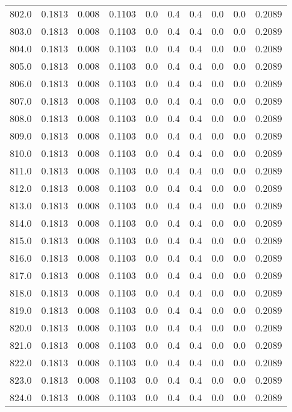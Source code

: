 \begin{longtable}{lrrrrrrrrr}
802.0 & 0.1813 & 0.008 & 0.1103 & 0.0 & 0.4 & 0.4 & 0.0 & 0.0 & 0.2089 \\
803.0 & 0.1813 & 0.008 & 0.1103 & 0.0 & 0.4 & 0.4 & 0.0 & 0.0 & 0.2089 \\
804.0 & 0.1813 & 0.008 & 0.1103 & 0.0 & 0.4 & 0.4 & 0.0 & 0.0 & 0.2089 \\
805.0 & 0.1813 & 0.008 & 0.1103 & 0.0 & 0.4 & 0.4 & 0.0 & 0.0 & 0.2089 \\
806.0 & 0.1813 & 0.008 & 0.1103 & 0.0 & 0.4 & 0.4 & 0.0 & 0.0 & 0.2089 \\
807.0 & 0.1813 & 0.008 & 0.1103 & 0.0 & 0.4 & 0.4 & 0.0 & 0.0 & 0.2089 \\
808.0 & 0.1813 & 0.008 & 0.1103 & 0.0 & 0.4 & 0.4 & 0.0 & 0.0 & 0.2089 \\
809.0 & 0.1813 & 0.008 & 0.1103 & 0.0 & 0.4 & 0.4 & 0.0 & 0.0 & 0.2089 \\
810.0 & 0.1813 & 0.008 & 0.1103 & 0.0 & 0.4 & 0.4 & 0.0 & 0.0 & 0.2089 \\
811.0 & 0.1813 & 0.008 & 0.1103 & 0.0 & 0.4 & 0.4 & 0.0 & 0.0 & 0.2089 \\
812.0 & 0.1813 & 0.008 & 0.1103 & 0.0 & 0.4 & 0.4 & 0.0 & 0.0 & 0.2089 \\
813.0 & 0.1813 & 0.008 & 0.1103 & 0.0 & 0.4 & 0.4 & 0.0 & 0.0 & 0.2089 \\
814.0 & 0.1813 & 0.008 & 0.1103 & 0.0 & 0.4 & 0.4 & 0.0 & 0.0 & 0.2089 \\
815.0 & 0.1813 & 0.008 & 0.1103 & 0.0 & 0.4 & 0.4 & 0.0 & 0.0 & 0.2089 \\
816.0 & 0.1813 & 0.008 & 0.1103 & 0.0 & 0.4 & 0.4 & 0.0 & 0.0 & 0.2089 \\
817.0 & 0.1813 & 0.008 & 0.1103 & 0.0 & 0.4 & 0.4 & 0.0 & 0.0 & 0.2089 \\
818.0 & 0.1813 & 0.008 & 0.1103 & 0.0 & 0.4 & 0.4 & 0.0 & 0.0 & 0.2089 \\
819.0 & 0.1813 & 0.008 & 0.1103 & 0.0 & 0.4 & 0.4 & 0.0 & 0.0 & 0.2089 \\
820.0 & 0.1813 & 0.008 & 0.1103 & 0.0 & 0.4 & 0.4 & 0.0 & 0.0 & 0.2089 \\
821.0 & 0.1813 & 0.008 & 0.1103 & 0.0 & 0.4 & 0.4 & 0.0 & 0.0 & 0.2089 \\
822.0 & 0.1813 & 0.008 & 0.1103 & 0.0 & 0.4 & 0.4 & 0.0 & 0.0 & 0.2089 \\
823.0 & 0.1813 & 0.008 & 0.1103 & 0.0 & 0.4 & 0.4 & 0.0 & 0.0 & 0.2089 \\
824.0 & 0.1813 & 0.008 & 0.1103 & 0.0 & 0.4 & 0.4 & 0.0 & 0.0 & 0.2089 \\

\end{longtable}
